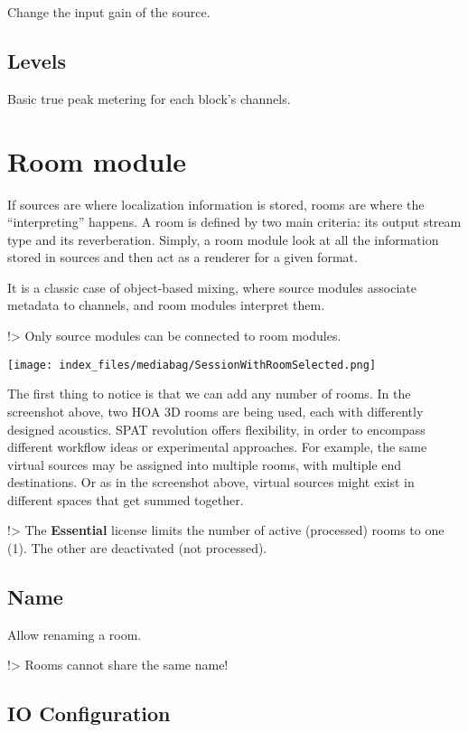 \documentclass[
  letterpaper,
  DIV=11,
  numbers=noendperiod]{scrreport}
\begin{document}
Change the input gain of the source.

\hypertarget{levels-1}{%
\subsection{Levels}\label{levels-1}}

Basic true peak metering for each block's channels.

\hypertarget{room-module}{%
\section{Room module}\label{room-module}}

If sources are where localization information is stored, rooms are where
the ``interpreting'' happens. A room is defined by two main criteria:
its output stream type and its reverberation. Simply, a room module look
at all the information stored in sources and then act as a renderer for
a given format.

It is a classic case of object-based mixing, where source modules
associate metadata to channels, and room modules interpret them.

!\textgreater{} Only source modules can be connected to room modules.

\texttt{[image: index\_files/mediabag/SessionWithRoomSelected.png]}

The first thing to notice is that we can add any number of rooms. In the
screenshot above, two HOA 3D rooms are being used, each with differently
designed acoustics. SPAT revolution offers flexibility, in order to
encompass different workflow ideas or experimental approaches. For
example, the same virtual sources may be assigned into multiple rooms,
with multiple end destinations. Or as in the screenshot above, virtual
sources might exist in different spaces that get summed together.

!\textgreater{} The \textbf{Essential} license limits the number of
active (processed) rooms to one (1). The other are deactivated (not
processed).

\hypertarget{name-2}{%
\subsection{Name}\label{name-2}}

Allow renaming a room.

!\textgreater{} Rooms cannot share the same name!

\hypertarget{io-configuration-1}{%
\subsection{IO Configuration}\label{io-configuration-1}}
\end{document}
